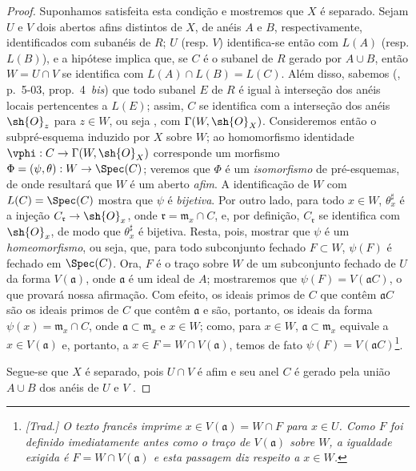 \documentclass[oneside]{amsart}
\makeatletter
\newcommand{\ega@arrow}[2]{\mathchoice{#1}{#2}{#2}{#2}}
\renewcommand{\to}{\ega@arrow{\longrightarrow}{\rightarrow}}
\makeatother
\begin{document}
\begin{proof}
Suponhamos satisfeita esta condição e mostremos que $X$ é separado.
Sejam $U$ e $V$ dois abertos afins distintos de $X$, de anéis $A$ e $B$, respectivamente, identificados com subanéis de $R$;
$U$ (resp. $V$) identifica-se então  com $L(A)$ (resp. $L(B)$), e a hipótese implica  que, se $C$ é o subanel de $R$ gerado por $A\cup B$, então $W=U\cap V$ se identifica com $L(A)\cap L(B)=L(C)$.
Além disso, sabemos (\cite{I-1}, p.~5-03, prop.~4~\emph{bis}) que todo subanel $E$ de $R$ é igual à interseção dos anéis locais pertencentes a $L(E)$;
assim, $C$ se identifica com a interseção dos anéis $\sh{O}_z$ para $z\in W$, ou seja , com $\Gamma(W,\sh{O}_X)$.
Consideremos então o subpré-esquema induzido por $X$ sobre $W$;
ao homomorfismo identidade $\vphi: C\to\Gamma(W,\sh{O}_X)$ corresponde  um morfismo $\Phi=(\psi,\theta):W\to\Spec(C)$;
veremos que $\Phi$ é um \emph{isomorfismo} de pré-esquemas, de onde resultará que $W$ é um aberto \emph{afim}.
A identificação de $W$ com $L(C)=\Spec(C)$ mostra que $\psi$ é \emph{bijetiva}.
Por outro lado, para todo $x\in W$, $\theta_x^\sharp$ é a injeção $C_\mathfrak{r}\to\sh{O}_x$, onde $\mathfrak{r}=\mathfrak{m}_x\cap C$, e, por definição, $C_\mathfrak{r}$ se identifica com $\sh{O}_x$, de modo que $\theta_x^\sharp$ é bijetiva.
Resta, pois, mostrar que $\psi$ é um \emph{homeomorfismo}, ou seja, que, para todo subconjunto fechado $F\subset W$, $\psi(F)$ é fechado em
$\Spec(C)$.
Ora, $F$ é o traço sobre $W$ de um subconjunto fechado de $U$ da forma $V(\mathfrak{a})$, onde $\mathfrak{a}$ é um ideal de $A$;
mostraremos que $\psi(F)=V(\mathfrak{a}C)$, o que provará nossa afirmação.
Com efeito, os ideais primos de $C$ que contêm $\mathfrak{a}C$ são os ideais primos de $C$ que contêm $\mathfrak{a}$ e são, portanto, os ideais da forma $\psi(x)=\mathfrak{m}_x\cap C$, onde $\mathfrak{a}\subset\mathfrak{m}_x$ e $x\in W$;
como, para $x\in W$, $\mathfrak{a}\subset\mathfrak{m}_x$ equivale a $x\in V(\mathfrak{a})$ e, portanto, a $x\in F=W\cap V(\mathfrak{a})$, temos de fato $\psi(F)=V(\mathfrak{a}C)$\footnote{\emph{[Trad.] O texto francês imprime $x\in V(\mathfrak a)=W\cap F$ para $x\in U$. Como $F$ foi definido imediatamente antes como o traço de $V(\mathfrak a)$ sobre $W$, a igualdade exigida é $F=W\cap V(\mathfrak a)$ e esta passagem diz respeito a $x\in W$.}}.

Segue-se que $X$ é separado, pois $U\cap V$ é afim e seu anel $C$ é gerado pela união $A\cup B$ dos anéis de $U$ e $V$ .


\end{proof}
\end{document}
